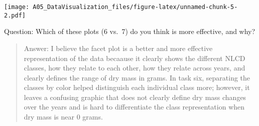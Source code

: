 \documentclass[]{article}
\begin{document}
\texttt{[image: A05\_DataVisualization\_files/figure-latex/unnamed-chunk-5-2.pdf]}

Question: Which of these plots (6 vs.~7) do you think is more effective,
and why?

\begin{quote}
Answer: I believe the facet plot is a better and more effective
representation of the data becaause it clearly shows the different NLCD
classes, how they relate to each other, how they relate across years,
and clearly defines the range of dry mass in grams. In task six,
separating the classes by color helped distinguish each individual class
more; however, it leaves a confusing graphic that does not clearly
define dry mass changes over the years and is hard to differentiate the
class representation when dry mass is near 0 grams.
\end{quote}
\end{document}
